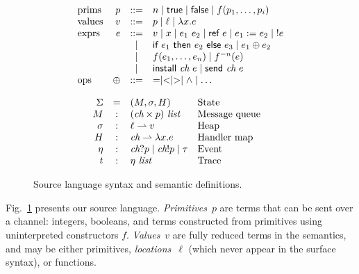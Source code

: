 \documentclass{entcs} \usepackage{entcsmacro}
\newcommand{\sfmt}[1]{\textsf{#1}}
\newcommand{\sch}{\textit{ch}}
\newcommand{\loc}{\ell}
\newcommand{\sassign}[2]{#1 := #2}
\newcommand{\sderef}[1]{!#1}
\newcommand{\sfalse}{\sfmt{false}}
\newcommand{\sif}[3]{\sfmt{if}~#1~\sfmt{then}~#2~\sfmt{else}~#3}
\newcommand{\sinstall}[2]{\sfmt{install}~#1~#2}
\newcommand{\sref}[1]{\sfmt{ref}~#1}
\newcommand{\ssend}[2]{\sfmt{send}~#1~#2}
\newcommand{\strue}{\sfmt{true}}
\newcommand{\partialfun}{\rightharpoonup}
\newcommand{\xv}{p}
\newcommand{\evt}{\eta}
\begin{document}
\begin{figure}[t!]
  \centering
  \begin{subfigure}{0.5\textwidth}
    \begin{displaymath}
      \begin{array}{lrcl}
        \hbox{prims} & \xv & ::= & n \mid \strue \mid \sfalse \mid f(\xv_1, \ldots, \xv_i) \\
        \hbox{values} & v & ::= & p \mid \loc \mid \lambda x.e \\
        \hbox{exprs} & e & ::= &
        v
        \mid x
        \mid e_1~e_2
        \mid  \sref{e}
        \mid \sassign{e_1}{e_2}
        \mid \;\sderef{e} \\
        && \mid & \sif{e_1}{e_2}{e_3}
        \mid e_1 \oplus e_2 \\
        && \mid & f(e_1, \ldots, e_n)
        \mid f^{-n}(e) \\
        && \mid & \sinstall{\sch}{e}
        \mid \ssend{\sch}{e} \\
        \hbox{ops} & \oplus & ::= &  = \mid < \mid > \mid \wedge \mid \ldots \\
      \end{array}
    \end{displaymath}
  \end{subfigure}
  \begin{subfigure}{0.5\textwidth}
    \begin{displaymath}
      \begin{array}{rclp{1in}}
        \Sigma & = & (M, \sigma, H) & State \\
        M & : & (\sch \times p) ~ \textit{list} & Message queue \\
        \sigma & : & \loc \partialfun  v & Heap \\
        H & : & \sch \partialfun \lambda x.e & Handler map \\
        \evt & : & \sch ? p \mid \sch ! p \mid \tau & Event \\
        t & : & \evt ~ \textit{list} & Trace \\
      \end{array}
    \end{displaymath}
  \end{subfigure}
  \caption{Source language syntax and semantic definitions.}
  \label{fig:lang}
\end{figure}

Fig.~\ref{fig:lang} presents our source language.
\emph{Primitives}~$p$ are terms that can be sent over a channel:
integers, booleans, and terms constructed from primitives using
uninterpreted constructors $f$.  \emph{Values}~$v$ are fully reduced terms in
the semantics, and may be either primitives, \emph{locations}~$\loc$
(which never appear in the surface syntax), or functions.
\end{document}
